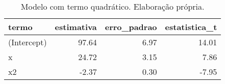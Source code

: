 \begin{table}

\caption{\label{tab:tabela_hetero}Modelo com termo quadrático. Elaboração própria.}
\centering
\begin{tabular}[t]{l|r|r|r}
\hline
termo & estimativa & erro\_padrao & estatistica\_t\\
\hline
(Intercept) & 97.64 & 6.97 & 14.01\\
\hline
x & 24.72 & 3.15 & 7.86\\
\hline
x2 & -2.37 & 0.30 & -7.95\\
\hline
\end{tabular}
\end{table}
